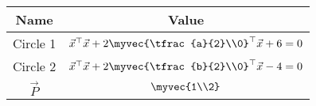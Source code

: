 \begin{tabular}{|c|c|}
\hline
Name & Value \\
\hline
Circle 1 & $\vec{x}^\top \vec{x} + 2\myvec{\tfrac{a}{2}\\0}^\top \vec{x} + 6 = 0$ \\
\hline
Circle 2 & $\vec{x}^\top \vec{x} + 2\myvec{\tfrac{b}{2}\\0}^\top \vec{x} - 4 = 0$ \\
\hline
$\vec{P}$ & $\myvec{1\\2}$ \\
\hline
\end{tabular}
